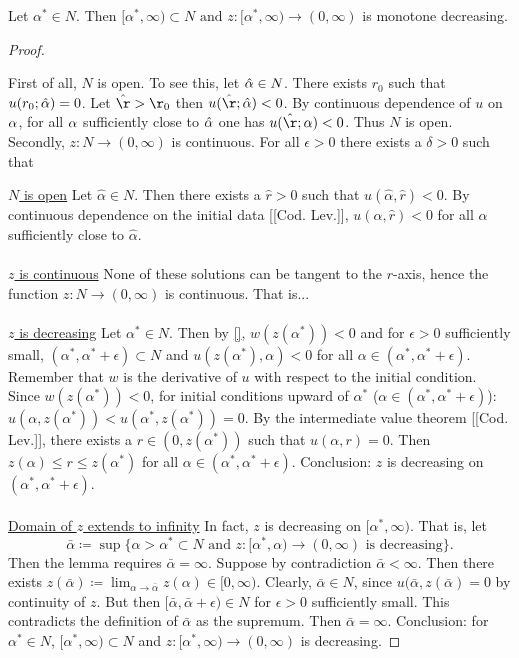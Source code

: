 \begin{lemma} Let $\alpha^*\in N$. Then $[\alpha^*,\infty)\subset N\text{ and }z:[\alpha^*,\infty)\to(0,\infty)$ is monotone decreasing.
\begin{proof}
\begin{outlines}
  \1 First of all, $N$ is open.
    \2 To see this, let $\hat{\alpha}\in N$.
    \2 There exists $r_0$ such that $u(r_0;\hat{\alpha})=0$.
    \2 Let $\hat\r>\r_0$ then $u(\hat\r;\hat\a)<0$.
    \2 By continuous dependence of $u$ on $\alpha$, for all $\alpha$ sufficiently close to $\hat{\alpha}$ one has $u(\hat\r;\a)<0$.
    \2 Thus $N$ is open.
  \1 Secondly, $z:N\to(0,\infty)$ is continuous.
    \2 For all $\epsilon>0$ there exists a $\delta>0$ such that
\end{outlines}

\underline{$N$ is open}
Let $\hat\alpha\in N$. Then there exists a $\hat r>0$ such that $u(\hat\alpha,\hat r)<0$. By continuous dependence on the initial data [[Cod. Lev.]], $u(\alpha,\hat r)<0$ for all $\alpha$ sufficiently close to $\hat\alpha$.
\\ \\

\underline{$z$ is continuous}
None of these solutions can be tangent to the $r$-axis, hence the function $z:N\to(0,\infty)$ is continuous. That is...
\\ \\

\underline{$z$ is decreasing}
Let $\alpha^*\in N$. Then by \ref{}, $w(z(\alpha^*))<0$ and for $\epsilon>0$ sufficiently small, $(\alpha^*,\alpha^*+\epsilon)\subset N$ and $u(z(\alpha^*),\alpha)<0$ for all $\alpha\in(\alpha^*,\alpha^*+\epsilon)$. Remember that $w$ is the derivative of $u$ with respect to the initial condition. Since $w(z(\alpha^*))<0$, for initial conditions upward of $\alpha^*$ ($\alpha\in(\alpha^*,\alpha^*+\epsilon)$): $u(\alpha,z(\alpha^*))<u(\alpha^*,z(\alpha^*))=0$. By the intermediate value theorem [[Cod. Lev.]], there exists a $r\in(0,z(\alpha^*))$ such that $u(\alpha,r)=0$. Then $z(\alpha)\leq r\leq z(\alpha^*)$ for all $\alpha\in(\alpha^*,\alpha^*+\epsilon)$. Conclusion: $z$ is decreasing on $(\alpha^*,\alpha^*+\epsilon)$.
\\ \\

\underline{Domain of $z$ extends to infinity}
In fact, $z$ is decreasing on $[\alpha^*,\infty)$. That is, let $$\bar\alpha\coloneqq\sup\{\alpha>\alpha^*\subset N\text{ and }z:[\alpha^*,\alpha)\to(0,\infty)\text{ is decreasing}\}.$$ Then the lemma requires $\bar\alpha=\infty$. Suppose by contradiction $\bar\alpha<\infty$.
Then there exists $z(\bar\alpha)\coloneqq\lim_{\alpha\to\bar\alpha}z(\alpha)\in[0,\infty).$ Clearly, $\bar\alpha\in N$, since $u(\bar\alpha,z(\bar\alpha)=0$ by continuity of $z$. But then $[\bar\alpha,\bar\alpha+\epsilon)\in N$ for $\epsilon>0$ sufficiently small. This contradicts the definition of $\bar\alpha$ as the supremum. Then $\bar\alpha=\infty$. Conclusion: for $\alpha^*\in N$, $[\alpha^*,\infty)\subset N$ and $z:[\alpha^*,\infty)\to(0,\infty)$ is decreasing.

\end{proof}
\end{lemma}
